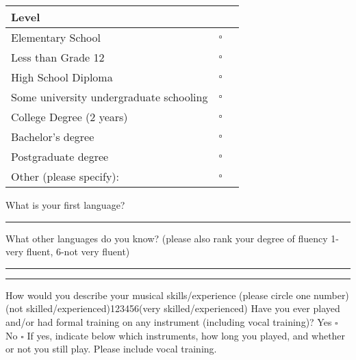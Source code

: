 \documentclass[12pt, a4paper]{article}
\begin{document}
\begin{tabular}{|m{12.2cm}|l|c|}
\hline
\textbf{Level} & \\ \hline
Elementary School & $\square$ \\[5pt] \hline
Less than Grade 12 & $\square$ \\[5pt] \hline
High School Diploma & $\square$ \\[5pt] \hline
Some university undergraduate schooling & $\square$ \\[5pt] \hline
College Degree (2 years) & $\square$ \\[5pt] \hline
Bachelor's degree & $\square$ \\[5pt] \hline
Postgraduate degree & $\square$ \\[5pt] \hline
Other (please specify):  & $\square$ \\[5pt] \hline
\end{tabular}
\vspace{8pt}
\newline What is your first language? \rule{5cm}{0.5pt}
\newline What other languages do you know? 
\newline(please also rank your degree of fluency 1-very fluent, 6-not very fluent)
\newline\rule{15cm}{0.5pt}
\newline\rule{15cm}{0.5pt}
\vspace{8pt}
\newline How would you describe your musical skills/experience (please circle one number)
\vspace{8pt}
\newline (not skilled/experienced)\hspace{12pt}1\hspace{12pt}2\hspace{12pt}3\hspace{12pt}4\hspace{12pt}5\hspace{12pt}6\hspace{12pt}(very skilled/experienced) 
\vspace{8pt}
\newline Have you ever played and/or had formal training on any instrument (including vocal training)? 
\newline Yes $\square$ No $\square$
\newline If yes, indicate below which instruments, how long you played, and whether or not you still play.
\newline Please include vocal training.
\end{document}
